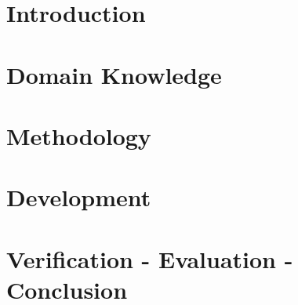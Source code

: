\documentclass[10pt,a4paper,bibliography=totoc]{scrbook}
\begin{document}
    
   

\tableofcontents
\newpage

\listoffigures
\newpage

\listofcodes
\cleardoublepage

%

\newpage

\part{Introduction}
 


\part{Domain Knowledge}  





\part{Methodology}  



\part{Development}








\part{Verification - Evaluation - Conclusion}


\end{document}
